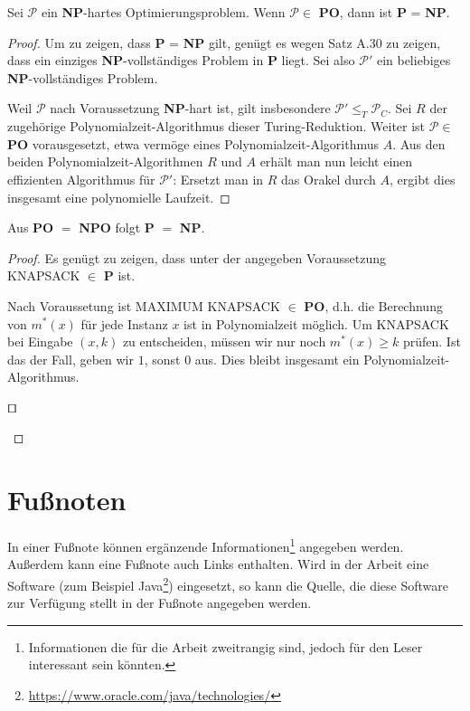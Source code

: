 \begin{theorem}
Sei $\mathcal{P}$ ein \textbf{NP}-hartes Optimierungsproblem. Wenn $\mathcal{P} \in$ \textbf{PO}, dann ist \textbf{P} = \textbf{NP}.
\end{theorem}

\begin{proof}
Um zu zeigen, dass \textbf{P} = \textbf{NP} gilt, genügt es wegen Satz A.30 zu zeigen, dass ein einziges \textbf{NP}-vollständiges Problem in \textbf{P} liegt. Sei also $\mathcal{P}'$ ein beliebiges \textbf{NP}-vollständiges Problem.

Weil $\mathcal{P}$ nach Voraussetzung \textbf{NP}-hart ist, gilt insbesondere $\mathcal{P}' \leq_T \mathcal{P}_C$. Sei $R$ der zugehörige Polynomialzeit-Algorithmus dieser Turing-Reduktion. Weiter ist $\mathcal{P} \in$ \textbf{PO} vorausgesetzt, etwa vermöge eines Polynomialzeit-Algorithmus $A$. Aus den beiden Polynomialzeit-Algorithmen $R$ und $A$ erhält man nun leicht einen effizienten Algorithmus für $\mathcal{P}'$: Ersetzt man in $R$ das Orakel durch $A$, ergibt dies insgesamt eine polynomielle Laufzeit.

\end{proof}

\begin{lemma}
Aus \textbf{PO} $=$ \textbf{NPO} folgt \textbf{P} $=$ \textbf{NP}.
\end{lemma}

\begin{proof}
Es genügt zu zeigen, dass unter der angegeben Voraussetzung KNAPSACK $\in$ \textbf{P} ist.

Nach Voraussetung ist MAXIMUM KNAPSACK $\in$ \textbf{PO}, d.h. die Berechnung von $m^*(x)$ für jede Instanz $x$ ist in Polynomialzeit möglich. Um KNAPSACK bei Eingabe $(x,k)$ zu entscheiden, müssen wir nur noch $m^*(x) \geq k$ prüfen. Ist das der Fall, geben wir $1$, sonst $0$ aus. Dies bleibt insgesamt ein Polynomialzeit-Algorithmus.

\begin{flushright}$\qed$\end{flushright}
\end{proof}

\section{Fußnoten}

In einer Fußnote können ergänzende Informationen\footnote{Informationen die für die Arbeit zweitrangig sind, jedoch für den Leser interessant sein könnten.} angegeben werden. Außerdem kann eine Fußnote auch Links enthalten. Wird in der Arbeit eine Software (zum Beispiel Java\footnote{\url{https://www.oracle.com/java/technologies/}}) eingesetzt, so kann die Quelle, die diese Software zur Verfügung stellt in der Fußnote angegeben werden.

